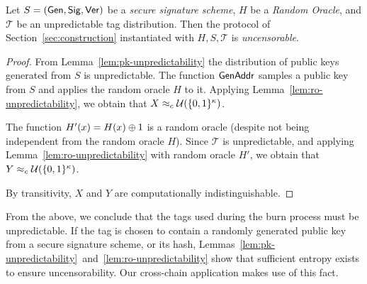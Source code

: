 \begin{theorem}[Uncensorability]
  Let $S = (\mathsf{Gen}, \mathsf{Sig}, \mathsf{Ver})$ be a \emph{secure signature scheme},
  $H$ be a \emph{Random Oracle},
  and $\mathcal{T}$ be an unpredictable tag distribution.
  Then the protocol of Section~\ref{sec:construction} instantiated with
  $H, S, \mathcal{T}$ is \emph{uncensorable}.
\end{theorem}
\begin{proof}
  From Lemma~\ref{lem:pk-unpredictability} the distribution of
  public keys generated from $S$ is unpredictable. The
  function $\mathsf{GenAddr}$ samples a public key from $S$ and applies the
  random oracle $H$ to it. Applying
  Lemma~\ref{lem:ro-unpredictability}, we obtain that
  $X \approx_c \mathcal{U}(\{0, 1\}^\kappa)$.

  The function $H'(x) = H(x) \oplus 1$ is a random oracle (despite not
  being independent from the random oracle $H$).
  Since $\mathcal{T}$ is unpredictable, and
  applying Lemma~\ref{lem:ro-unpredictability} with random oracle $H'$, we
  obtain that $Y \approx_c \mathcal{U}(\{0, 1\}^\kappa)$.

  By transitivity, $X$ and $Y$ are computationally indistinguishable.
\end{proof}

From the above, we conclude that the tags used during the burn process must be
unpredictable. If the tag is chosen to contain a randomly generated public key
from a secure signature scheme, or its hash,
Lemmas~\ref{lem:pk-unpredictability}~and~\ref{lem:ro-unpredictability} show that
sufficient entropy exists to ensure uncensorability. Our cross-chain application
makes use of this fact.
